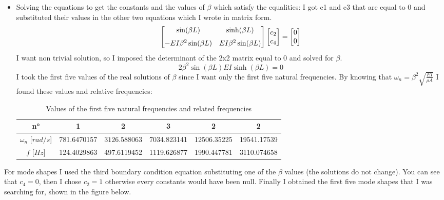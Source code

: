 \documentclass[11pt,a4paper]{article}
\begin{document}
\begin{enumerate}
\begin{itemize}
		 \smallskip
		 
		\item Solving the equations to get the constants and the values of $\beta$ which satisfy the equalities: I got c1 and c3 that are equal to 0 and substituted their values in the other two equations which I wrote in matrix form.
		\begin{equation*}
		\begin{bmatrix}
			\sin(\beta L)            & \sinh(\beta L) \\ \noalign{\medskip}
			-EI\beta^2 \sin(\beta L) & EI\beta^2 \sin(\beta L)
		\end{bmatrix} \begin{bmatrix} c_2 \\ c_4 \end{bmatrix} =
		\begin{bmatrix} 0 \\ 0 \end{bmatrix}	
		\end{equation*}
		I want non trivial solution, so I imposed the determinant of the 2x2 matrix equal to 0 and solved for $\beta$.
		\begin{equation}
		2{\beta}^{2}\sin(\beta L) EI\sinh(\beta L)=0		
		\end{equation}
		I took the first five values of the real solutions of $\beta$
		since I want only the first five natural frequencies. By knowing that $\omega_n=\beta^2 \sqrt{\frac{EI}{\rho A}}$ I found these values and relative frequencies:
		
		\begin{table}[h]
			\centering
			\begin{tabular}{c c c c c c} 
				\toprule
				\textbf{n°} & \textbf{1} & \textbf{2} & \textbf{3} & \textbf{2} & \textbf{2} \\
				\midrule	    		   	    		
				$\omega_n$ [$rad/s$] & 781.6470157 & $3126.588063$ & 7034.823141 & 12506.35225 & 19541.17539 \\
				\midrule	    		
				$f$ [$Hz$]  & 124.4029863 & 497.6119452 & 1119.626877 & 1990.447781 & 3110.074658 \\	    		   
				\bottomrule
			\end{tabular}
			\caption{Values of the first five natural frequencies and related frequencies}
		\end{table}
		
		
	\end{itemize}	
	For mode shapes I used the third boundary condition equation substituting one of the $\beta$ values (the solutions do not change). You can see that $c_4=0$, then I chose $c_2=1$ otherwise every constants would have been null. 
	Finally I obtained the first five mode shapes that I was searching for, shown in the figure below.
	

\end{enumerate}
\end{document}

